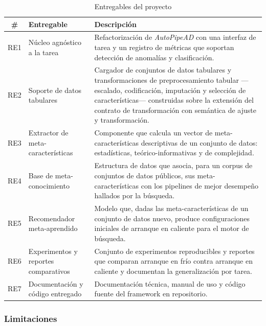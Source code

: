 \documentclass[12pt,letterpaper,oneside]{article}
\begin{document}
\begin{table}[H]
\centering
\small
\caption{Entregables del proyecto}
\label{tab:entregables}
\begin{tabularx}{\textwidth}{>{}C>{}L>{}L}
\toprule
\textbf{\#} & \textbf{Entregable} & \textbf{Descripción} \\
\midrule
RE1 & Núcleo agnóstico a la tarea &
Refactorización de \textit{AutoPipeAD} con una interfaz de tarea y un registro de
métricas que soportan detección de anomalías y clasificación. \\
\addlinespace
RE2 & Soporte de datos tabulares &
Cargador de conjuntos de datos tabulares y transformaciones de preprocesamiento tabular
—escalado, codificación, imputación y selección de características— construidas sobre la
extensión del contrato de transformación con semántica de ajuste y transformación. \\
\addlinespace
RE3 & Extractor de meta-características &
Componente que calcula un vector de meta-características descriptivas de un conjunto de
datos: estadísticas, teórico-informativas y de complejidad. \\
\addlinespace
RE4 & Base de meta-conocimiento &
Estructura de datos que asocia, para un corpus de conjuntos de datos públicos, sus
meta-características con los pipelines de mejor desempeño hallados por la búsqueda. \\
\addlinespace
RE5 & Recomendador meta-aprendido &
Modelo que, dadas las meta-características de un conjunto de datos nuevo, produce
configuraciones iniciales de arranque en caliente para el motor de búsqueda. \\
\addlinespace
RE6 & Experimentos y reportes comparativos &
Conjunto de experimentos reproducibles y reportes que comparan arranque en frío contra
arranque en caliente y documentan la generalización por tarea. \\
\addlinespace
RE7 & Documentación y código entregado &
Documentación técnica, manual de uso y código fuente del framework en repositorio. \\
\bottomrule
\end{tabularx}
\end{table}

\subsubsection{Limitaciones}
\end{document}
